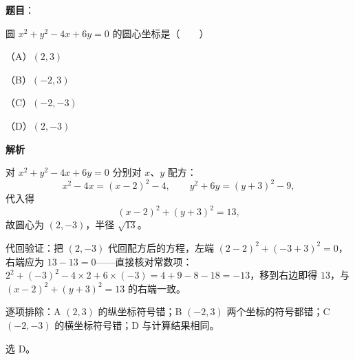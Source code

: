 \begin{answer}

\textbf{题目}：

圆 $x^2+y^2-4x+6y=0$ 的圆心坐标是\mbox{（　　）}

（A）$(2,3)$

（B）$(-2,3)$

（C）$(-2,-3)$

（D）$(2,-3)$

\textbf{解析}

对 $x^2+y^2-4x+6y=0$ 分别对 $x$、$y$ 配方：
\nopagebreak[4]
\[
x^2-4x=(x-2)^2-4,\qquad y^2+6y=(y+3)^2-9,
\]
代入得
\nopagebreak[4]
\[
(x-2)^2+(y+3)^2=13,
\]
故圆心为 $(2,-3)$，半径 $\sqrt{13}$。

代回验证：把 $(2,-3)$ 代回配方后的方程，左端 $(2-2)^2+(-3+3)^2=0$，右端应为 $13-13=0$——直接核对常数项：$2^2+(-3)^2-4\times2+6\times(-3)=4+9-8-18=-13$，移到右边即得 $13$，与 $(x-2)^2+(y+3)^2=13$ 的右端一致。

逐项排除：A $(2,3)$ 的纵坐标符号错；B $(-2,3)$ 两个坐标的符号都错；C $(-2,-3)$ 的横坐标符号错；D 与计算结果相同。

选 D。


\end{answer}

